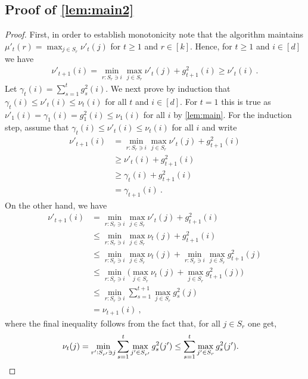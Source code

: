 \documentclass[a4paper,11pt]{article}
\newcommand{\LR}[1]{\mathopen{}\Big(#1\Big)}
\newcommand{\mi}[1]{\nu_{#1}}
\newcommand{\tmx}[1]{\mu'_{#1}}
\newcommand{\tmi}[1]{\nu'_{#1}}
\begin{document}
\subsection{Proof of \cref{lem:main2}}

\begin{proof}
First, in order to establish monotonicity note that the algorithm maintains
$\tmx{t}(r) = \max_{j \in S_r} \tmi{t}(j)$ for $t\geq 1$ and $r \in [k]$.
Hence, for $t\geq 1$ and $i \in [d]$ we have
\begin{align*}
  \tmi{t+1}(i)
  =
  \min_{r : S_r \ni i} \max_{j \in S_r} \tmi{t}(j) + g^2_{t+1}(i)
  \geq
  \tmi{t}(i)
  ~.
\end{align*}
Let $\gamma_t(i) = \sum_{s=1}^t g^2_{s}(i)$. We next prove by induction that
$\gamma_t(i) \leq \tmi{t}(i) \leq \mi{t}(i)$ for all $t$ and $i \in [d]$.
For $t=1$ this is true as $\tmi{1}(i) = \gamma_1(i)  = g^2_{1}(i) \leq \mi{1}(i)$ for all $i$ by \cref{lem:main}.
For the induction step, assume that $\gamma_t(i) \leq \tmi{t}(i) \leq \mi{t}(i)$ for all $i$ and write
\begin{align*}
  \tmi{t+1}(i)
  &=
  \min_{r : S_r \ni i} \max_{j \in S_r} \tmi{t}(j) + g^2_{t+1}(i)
  \\
  &\geq
  \tmi{t}(i) + g^2_{t+1}(i)
  \\
  &\geq
  \gamma_t(i) + g^2_{t+1}(i)
  \\
  &=
  \gamma_{t+1}(i)
  ~ .
\end{align*}
On the other hand, we have
\begin{align*}
  \tmi{t+1}(i)
  &=
  \min_{r : S_r \ni i} \max_{j \in S_r} \tmi{t}(j) + g^2_{t+1}(i)
  \\
  &\leq
  \min_{r : S_r \ni i} \max_{j \in S_r} \mi{t}(j) + g^2_{t+1}(i)
  \\
  &\leq
  \min_{r : S_r \ni i} \max_{j \in S_r} \mi{t}(j) + \min_{r : S_r \ni i}
  \max_{j \in S_r} g^2_{t+1}(j)
  \\
  &\leq
  \min_{r : S_r \ni i} \LR{ \max_{j \in S_r} \mi{t}(j) + \max_{j \in S_r} g^2_{t+1}(j) }
  \\
  &\leq \min_{r : S_r \ni i} \sum_{s=1}^{t+1} \max_{j \in S_r} g^2_{s}(j)
  \\
  &=
  \mi{t+1}(i) ~ ,
\end{align*}
where the final inequality follows from the fact that, for all $j \in S_r$ one
get,
\begin{align*}
  \mi{t}(j)
  =
  \min_{r' : S_{r'} \ni j} \sum_{s=1}^t \max_{j' \in S_{r'}} g^2_{s}(j')
  \leq
  \sum_{s=1}^t \max_{j' \in S_r} g^2_{s}(j')
  .
  &\qedhere
\end{align*}
\end{proof}
\end{document}
